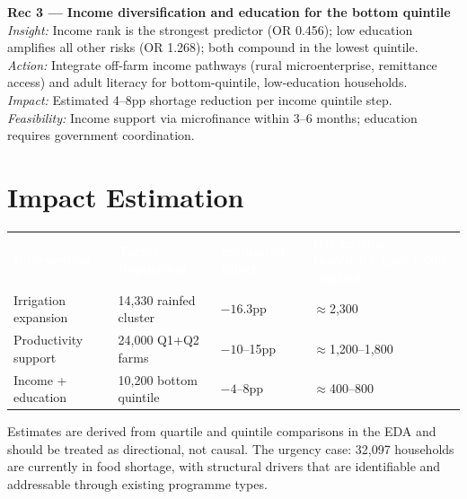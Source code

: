 \documentclass[11pt,a4paper]{article}
\newcommand{\tH}[1]{\cellcolor{rhoRed}\textcolor{white}{\textbf{#1}}}
\begin{document}
\vspace{7pt}

\begin{findingbox}
\textbf{Rec 3 — Income diversification and education for the bottom quintile}\\[4pt]
\textit{Insight:} Income rank is the strongest predictor (OR 0.456); low education amplifies all other risks (OR 1.268); both compound in the lowest quintile.\\[3pt]
\textit{Action:} Integrate off-farm income pathways (rural microenterprise, remittance access) and adult literacy for bottom-quintile, low-education households.\\[3pt]
\textit{Impact:} Estimated 4--8pp shortage reduction per income quintile step.\\[3pt]
\textit{Feasibility:} Income support via microfinance within 3--6 months; education requires government coordination.
\end{findingbox}

\newpage

\section{Impact Estimation}

\begin{tabularx}{\linewidth}{@{}p{3.4cm} p{3.0cm} p{2.4cm} L@{}}
  \tH{Intervention} & \tH{Target Population} & \tH{Estimated Effect} & \tH{HH Exiting Insecurity (per 1,000 reached)} \\
  Irrigation expansion  & 14,330 rainfed cluster  & $-16.3$pp   & $\approx$2,300 \\
  Productivity support  & 24,000 Q1+Q2 farms      & $-10$--15pp & $\approx$1,200--1,800 \\
  Income + education    & 10,200 bottom quintile  & $-4$--8pp   & $\approx$400--800 \\
  \bottomrule
\end{tabularx}

Estimates are derived from quartile and quintile comparisons in the EDA and should be treated as directional, not causal. The urgency case: 32,097 households are currently in food shortage, with structural drivers that are identifiable and addressable through existing programme types.

\vspace{10pt}
\end{document}
